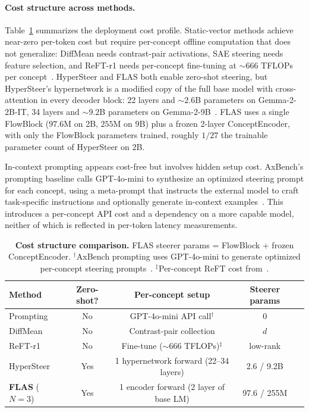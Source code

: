 \documentclass{article}
\begin{document}
\paragraph{Cost structure across methods.}
Table~\ref{tab:cost_structure} summarizes the deployment cost profile. Static-vector methods achieve near-zero per-token cost but require per-concept offline computation that does not generalize: DiffMean needs contrast-pair activations, SAE steering needs feature selection, and ReFT-r1 needs per-concept fine-tuning at ${\sim}666$ TFLOPs per concept~\citep{Sun2025}. HyperSteer and FLAS both enable zero-shot steering, but HyperSteer's hypernetwork is a modified copy of the full base model with cross-attention in every decoder block: 22 layers and ${\sim}2.6$B parameters on Gemma-2-2B-IT, 34 layers and ${\sim}9.2$B parameters on Gemma-2-9B~\citep{Sun2025}. FLAS uses a single FlowBlock ($97.6$M on 2B, $255$M on 9B) plus a frozen 2-layer ConceptEncoder, with only the FlowBlock parameters trained, roughly $1/27$ the trainable parameter count of HyperSteer on 2B.

In-context prompting appears cost-free but involves hidden setup cost. AxBench's prompting baseline calls GPT-4o-mini to synthesize an optimized steering prompt for each concept, using a meta-prompt that instructs the external model to craft task-specific instructions and optionally generate in-context examples~\citep{Wu2025}. This introduces a per-concept API cost and a dependency on a more capable model, neither of which is reflected in per-token latency measurements.

\begin{table}[htbp]
\centering\footnotesize
\begin{tabular}{lcccc}
\toprule
\textbf{Method} & \textbf{Zero-shot?} & \textbf{Per-concept setup}  & \textbf{Steerer params} \\
\midrule
Prompting            & No & GPT-4o-mini API call$^\dagger$  & 0 \\
DiffMean             & No  & Contrast-pair collection     & $d$ \\
ReFT-r1              & No  & Fine-tune (${\sim}666$ TFLOPs)$^\ddagger$  & low-rank \\
HyperSteer           & Yes & 1 hypernetwork forward (22--34 layers)     & 2.6 / 9.2B \\
\rowcolor{oursbg}
\textbf{FLAS} ($N\!=\!3$)  & Yes & 1 encoder forward (2 layer of base LM)  & 97.6 / 255M \\
\bottomrule
\end{tabular}
\caption{\textbf{Cost structure comparison.} FLAS steerer params = FlowBlock + frozen ConceptEncoder. $^\dagger$AxBench prompting uses GPT-4o-mini to generate optimized per-concept steering prompts~\citep{Wu2025}. $^\ddagger$Per-concept ReFT cost from~\citet{Sun2025}.}
\label{tab:cost_structure}
\vspace{-2em}
\end{table}
\end{document}
